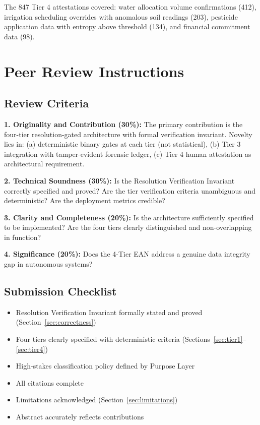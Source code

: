 \documentclass[12pt]{article}
\begin{document}
The 847 Tier 4 attestations covered: water allocation volume confirmations (412), irrigation scheduling overrides with anomalous soil readings (203), pesticide application data with entropy above threshold (134), and financial commitment data (98).

\section*{Peer Review Instructions}
\label{sec:peer-review}

\subsection*{Review Criteria}

\textbf{1. Originality and Contribution (30\%):} The primary contribution is the four-tier resolution-gated architecture with formal verification invariant. Novelty lies in: (a) deterministic binary gates at each tier (not statistical), (b) Tier 3 integration with tamper-evident forensic ledger, (c) Tier 4 human attestation as architectural requirement.

\textbf{2. Technical Soundness (30\%):} Is the Resolution Verification Invariant correctly specified and proved? Are the tier verification criteria unambiguous and deterministic? Are the deployment metrics credible?

\textbf{3. Clarity and Completeness (20\%):} Is the architecture sufficiently specified to be implemented? Are the four tiers clearly distinguished and non-overlapping in function?

\textbf{4. Significance (20\%):} Does the 4-Tier EAN address a genuine data integrity gap in autonomous systems?

\subsection*{Submission Checklist}

\begin{itemize}
    \item[ ] Resolution Verification Invariant formally stated and proved (Section~\ref{sec:correctness})
    \item[ ] Four tiers clearly specified with deterministic criteria (Sections~\ref{sec:tier1}--\ref{sec:tier4})
    \item[ ] High-stakes classification policy defined by Purpose Layer
    \item[ ] All citations complete
    \item[ ] Limitations acknowledged (Section~\ref{sec:limitations})
    \item[ ] Abstract accurately reflects contributions
\end{itemize}
\end{document}
